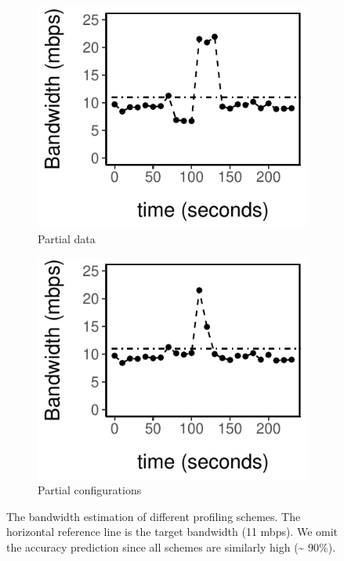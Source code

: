 \begin{figure}
  \\
  \vspace{1.5em}
  \begin{subfigure}[t]{0.49\columnwidth}
    \includegraphics[width=\textwidth]{figures/online3.pdf}
    \caption{Partial data}
    \label{fig:online-partial}
  \end{subfigure}
  \hfill
  \begin{subfigure}[t]{0.49\columnwidth}
    \includegraphics[width=\textwidth]{figures/online4.pdf}
    \caption{Partial configurations}
    \label{fig:online-trigger}
  \end{subfigure}
  \caption{The bandwidth estimation of different profiling schemes. The
    horizontal reference line is the target bandwidth (11 mbps). We omit the
    accuracy prediction since all schemes are similarly high (\textasciitilde
    90\%).}
  \label{fig:online-tricks}
\end{figure}

